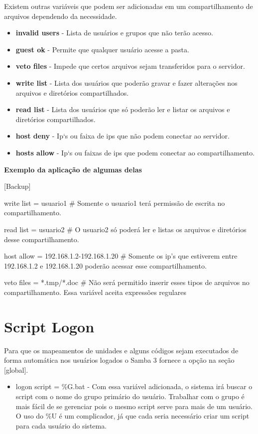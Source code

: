 Existem outras variáveis que podem ser adicionadas em um compartilhamento de arquivos dependendo da necessidade.

\begin{itemize}
	\item \textbf{invalid users} - Lista de usuários e grupos que não terão acesso.
	\item \textbf{guest ok} - Permite que qualquer usuário acesse a pasta.
	\item \textbf{veto files} - Impede que certos arquivos sejam transferidos para o servidor.
	\item \textbf{write list} - Lista dos usuários que poderão gravar e fazer alterações nos arquivos e diretórios compartilhados.
	\item \textbf{read list} - Lista dos usuários que só poderão ler e listar os arquivos e diretórios compartilhados.
	\item \textbf{host deny} - Ip`s ou faixa de ips que não podem conectar ao servidor.
	\item \textbf{hosts allow} - Ip`s ou faixas de ips que podem conectar ao compartilhamento.
\end{itemize}

\textbf{Exemplo da aplicação de algumas delas}

[Backup]

write list = usuario1 \# Somente o usuario1 terá permissão de escrita no compartilhamento.

read list = usuario2 \# O usuario2 só poderá ler e listas os arquivos e diretórios desse compartilhamento.

host allow = 192.168.1.2-192.168.1.20 \# Somente os ip's que estiverem entre 192.168.1.2 e 192.168.1.20 poderão acessar esse compartilhamento.

veto files = *.tmp/*.doc \# Não será permitido inserir esses tipos de arquivos no compartilhamento. Essa variável aceita expressões regulares

\section{Script Logon}

Para que os mapeamentos de unidades e alguns códigos sejam executados de forma automática nos usuários logados o Samba 3 fornece a opção na seção [global]. 

\begin{itemize}
	\item {logon script = \%G.bat } - Com essa variável adicionada, o sistema irá buscar o script com o nome do grupo primário do usuário. Trabalhar com o grupo é mais fácil de se gerenciar pois o mesmo script serve para mais de um usuário. O uso do \%U é um complicador, já que cada seria necessário criar um script para cada usuário do sistema.
\end{itemize}

